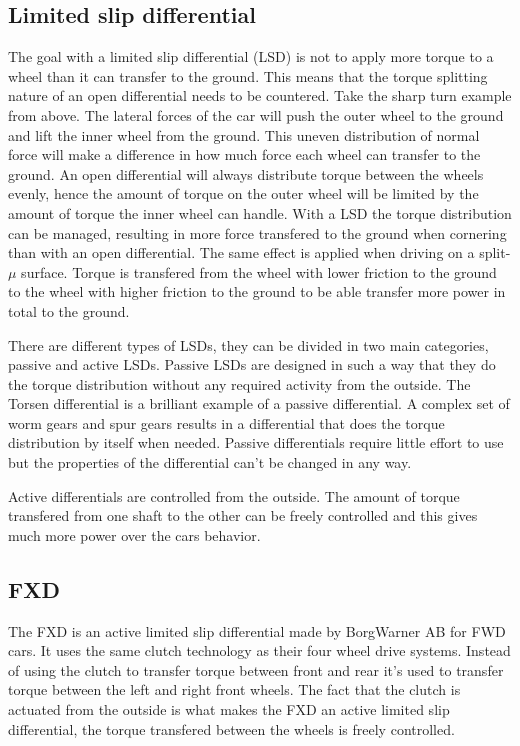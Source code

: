\subsection{Limited slip differential}
The goal with a limited slip differential (LSD) is not to apply more torque to a wheel than it can transfer to the ground. This means that the torque splitting nature of an open differential needs to be countered. Take the sharp turn example from above. The lateral forces of the car will push the outer wheel to the ground and lift the inner wheel from the ground. This uneven distribution of normal force will make a difference in how much force each wheel can transfer to the ground. An open differential will always distribute torque between the wheels evenly, hence the amount of torque on the outer wheel will be limited by the amount of torque the inner wheel can handle. With a LSD the torque distribution can be managed, resulting in more force transfered to the ground when cornering than with an open differential. The same effect is applied when driving on a split-$ \mu $ surface. Torque is transfered from the wheel with lower friction to the ground to the wheel with higher friction to the ground to be able transfer more power in total to the ground.

There are different types of LSDs, they can be divided in two main categories, passive and active LSDs. Passive LSDs are designed in such a way that they do the torque distribution without any required activity from the outside. The Torsen differential is a brilliant example of a passive differential. A complex set of worm gears and spur gears results in a differential that does the torque distribution by itself when needed. Passive differentials require little effort to use but the properties of the differential can't be changed in any way.

Active differentials are controlled from the outside. The amount of torque transfered from one shaft to the other can be freely controlled and this gives much more power over the cars behavior.

\subsection{FXD}
The FXD is an active limited slip differential made by BorgWarner AB for FWD cars. It uses the same clutch technology as their four wheel drive systems. Instead of using the clutch to transfer torque between front and rear it's used to transfer torque between the left and right front wheels. The fact that the clutch is actuated from the outside is what makes the FXD an active limited slip differential, the torque transfered between the wheels is freely controlled.

